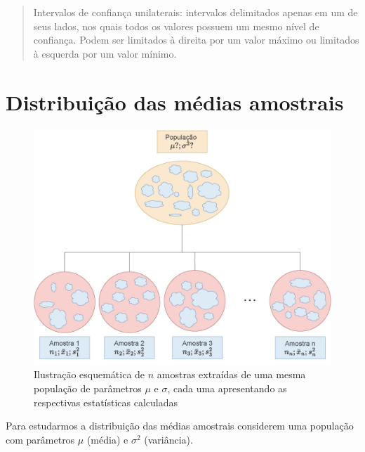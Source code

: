 \documentclass[
]{book}
\begin{document}
\begin{quote}
Intervalos de confiança unilaterais: intervalos delimitados apenas em um de seus lados, nos quais todos os valores possuem um mesmo nível de confiança. Podem ser limitados à direita por um valor máximo ou limitados à esquerda por um valor mínimo.
\end{quote}

\hypertarget{distribuiuxe7uxe3o-das-muxe9dias-amostrais}{%
\section{Distribuição das médias amostrais}\label{distribuiuxe7uxe3o-das-muxe9dias-amostrais}}

\hfill\break

\begin{figure}

{\centering \includegraphics[width=1\linewidth]{images9/dist_amostral_med} 

}

\caption{Ilustração esquemática de $n$ amostras extraídas de uma mesma população de parâmetros $\mu$ e $\sigma$, cada uma apresentando as respectivas estatísticas calculadas}\label{fig:fig45}
\end{figure}

\hfill\break

Para estudarmos a distribuição das médias amostrais considerem uma população com parâmetros \(\mu\) (média) e \(\sigma^{2}\) (variância).

\hfill\break
\end{document}
